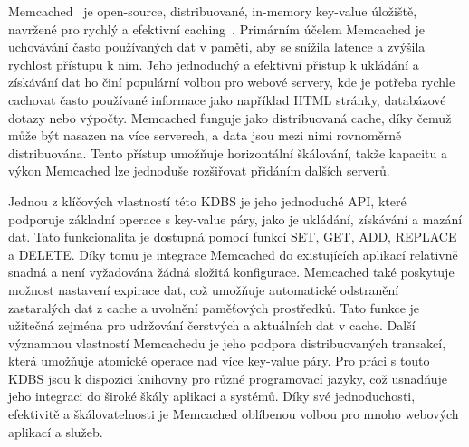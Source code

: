 \documentclass[czech,master,dept460,male,csharp,cpdeclaration]{diploma}
\begin{document}
	Memcached~\cite{memcached} je open-source, distribuované, in-memory key-value úložiště, navržené pro rychlý a efektivní caching~\cite{cachovani}. Primárním účelem Memcached je uchovávání často používaných dat v paměti, aby se snížila latence a zvýšila rychlost přístupu k nim. Jeho jednoduchý a efektivní přístup k ukládání a získávání dat ho činí populární volbou pro webové servery, kde je potřeba rychle cachovat často používané informace jako například HTML stránky, databázové dotazy nebo výpočty. Memcached funguje jako distribuovaná cache, díky čemuž může být nasazen na více serverech, a data jsou mezi nimi rovnoměrně distribuována. Tento přístup umožňuje horizontální škálování, takže kapacitu a výkon Memcached lze jednoduše rozšiřovat přidáním dalších serverů.
	
	Jednou z klíčových vlastností této KDBS je jeho jednoduché API, které podporuje základní operace s key-value páry, jako je ukládání, získávání a mazání dat. Tato funkcionalita je dostupná pomocí funkcí SET, GET, ADD, REPLACE a DELETE. Díky tomu je integrace Memcached do existujících aplikací relativně snadná a není vyžadována žádná složitá konfigurace. Memcached také poskytuje možnost nastavení expirace dat, což umožňuje automatické odstranění zastaralých dat z cache a uvolnění paměťových prostředků. Tato funkce je užitečná zejména pro udržování čerstvých a aktuálních dat v cache. Další významnou vlastností Memcachedu je jeho podpora distribuovaných transakcí, která umožňuje atomické operace nad více key-value páry. Pro práci s touto KDBS jsou k dispozici knihovny pro různé programovací jazyky, což usnadňuje jeho integraci do široké škály aplikací a systémů. Díky své jednoduchosti, efektivitě a škálovatelnosti je Memcached oblíbenou volbou pro mnoho webových aplikací a služeb.
\end{document}
